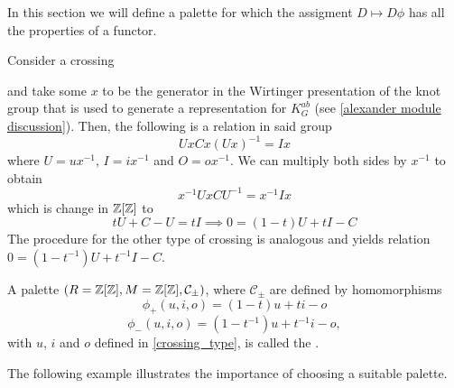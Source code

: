 
In this section we will define a palette for which the assigment $D\mapsto D\phi$ has all the properties of a functor.

Consider a crossing
\begin{center}
\end{center}
and take some $x$ to be the generator in the Wirtinger presentation of the knot group that is used to generate a representation for $K_G^{ab}$ (see \cref{alexander module discussion}). Then, the following is a relation in said group
$$UxCx(Ux)^{-1}=Ix$$
where $U=ux^{-1}$, $I=ix^{-1}$ and $O=ox^{-1}$. 
We can multiply both sides by $x^{-1}$ to obtain
$$x^{-1}UxCU^{-1}=x^{-1}Ix$$
which is change in $\operatorname{\mathbb{Z}}[\operatorname{\mathbb{Z}}]$ to
$$
tU+C-U=tI\implies 0=(1-t)U+tI-C
$$
The procedure for the other type of crossing is analogous and yields relation $0=(1-t^{-1})U+t^{-1}I-C$.

\begin{definition}
A palette {\boldmath$(R=\operatorname{\mathbb{Z}}[\operatorname{\mathbb{Z}}], M=\operatorname{\mathbb{Z}}[\operatorname{\mathbb{Z}}], \mathcal{C}_\pm)$}, where $\mathcal{C}_\pm$ are defined by homomorphisms
$$\phi_+(u,i,o)=(1-t)u+ti-o$$
$$\phi_-(u,i,o)=(1-t^{-1})u+t^{-1}i-o,$$
with $u$, $i$ and $o$ defined in \cref{crossing_type}, is called the .
\end{definition}




The following example illustrates the importance of choosing a suitable palette.

